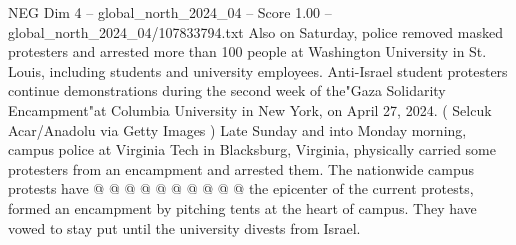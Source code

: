 \begin{textsample}{NEG Dim 4 – global\_north\_2024\_04 – Score 1.00 – global\_north\_2024\_04/107833794.txt}
Also on Saturday, police removed masked protesters and arrested more than 100 people at Washington University in St.
Louis, including students and university employees.
Anti-Israel student protesters continue demonstrations during the second week of the"Gaza Solidarity Encampment"at Columbia University in New York, on April 27, 2024. ( Selcuk Acar/Anadolu via Getty Images ) Late Sunday and into Monday morning, campus police at Virginia Tech in Blacksburg, Virginia, physically carried some protesters from an encampment and arrested them.
The nationwide campus protests have @ @ @ @ @ @ @ @ @ @ the epicenter of the current protests, formed an encampment by pitching tents at the heart of campus.
They have vowed to stay put until the university divests from Israel.

\end{textsample}
